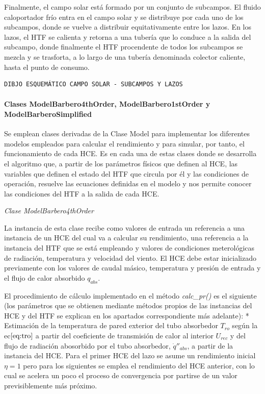 \documentclass[11pt]{article}
\begin{document}
Finalmente, el campo solar está formado por un conjunto de subcampos. El
fluido caloportador frío entra en el campo solar y se distribuye por
cada uno de los subcampos, donde se vuelve a distribuir equitativamente
entre los lazos. En los lazos, el HTF se calienta y retorna a una
tubería que lo conduce a la salida del subcampo, donde finalmente el HTF
procendente de todos los subcampos se mezcla y se trasforta, a lo largo
de una tubería denominada colector caliente, hasta el punto de consumo.

\begin{verbatim}
DIBJO ESQUEMÁTICO CAMPO SOLAR - SUBCAMPOS Y LAZOS
\end{verbatim}

\hypertarget{clases-modelbarbero4thorder-modelbarbero1storder-y-modelbarberosimplified}{%
\paragraph{Clases ModelBarbero4thOrder, ModelBarbero1stOrder y
ModelBarberoSimplified}\label{clases-modelbarbero4thorder-modelbarbero1storder-y-modelbarberosimplified}}

Se emplean clases derivadas de la Clase Model para implementar los
diferentes modelos empleados para calcular el rendimiento y para
simular, por tanto, el funcionamiento de cada HCE. Es en cada una de
estas clases donde se desarrolla el algoritmo que, a partir de los
parámetros físicos que definen al HCE, las variables que definen el
estado del HTF que circula por él y las condiciones de operación,
resuelve las ecuaciones definidas en el modelo y nos permite conocer las
condiciones del HTF a la salida de cada HCE.

\emph{Clase ModelBarbero4thOrder}

La instancia de esta clase recibe como valores de entrada un referencia
a una instancia de un HCE del cual va a calcular su rendimiento, una
referencia a la instancia del HTF que se está empleando y valores de
condiciones meterológicas de radiación, temperatura y velocidad del
viento. El HCE debe estar inicializado previamente con los valores de
caudal másico, temperatura y presión de entrada y el flujo de calor
absorbido \(q_{abs}\).

El procedimiento de cálculo implementado en el método \emph{calc\_pr()}
es el siguiente (los parámetros que se obtienen mediante métodos propios
de las instancias del HCE y del HTF se explican en los apartados
correspondiente más adelante): * Estimación de la temperatura de pared
exterior del tubo absorbedor \(T_{ro}\) según la ec\(\eqref{eq:tro}\) a
partir del coeficiente de transmisión de calor al interior \(U_{rec}\) y
del flujo de radiación abosorbido por el tubo absorbedor,
\(\dot q''_{abs}\), a partir de la instancia del HCE. Para el primer HCE
del lazo se asume un rendimiento inicial \(\eta=1\) pero para los
siguientes se emplea el rendimiento del HCE anterior, con lo cual se
acelera un poco el proceso de convergencia por partirse de un valor
previsiblemente más próximo.
\end{document}
